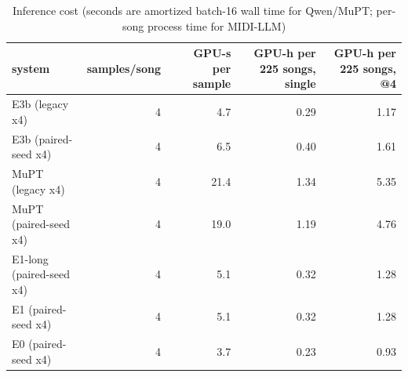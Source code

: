 \begin{table}[t]
\centering
\small
\begin{tabular}{lrrrr}
\toprule
system & samples/song & GPU-s per sample & GPU-h per 225 songs, single & GPU-h per 225 songs, @4 \\
\midrule
E3b (legacy x4) & 4 & 4.7 & 0.29 & 1.17 \\
E3b (paired-seed x4) & 4 & 6.5 & 0.40 & 1.61 \\
MuPT (legacy x4) & 4 & 21.4 & 1.34 & 5.35 \\
MuPT (paired-seed x4) & 4 & 19.0 & 1.19 & 4.76 \\
E1-long (paired-seed x4) & 4 & 5.1 & 0.32 & 1.28 \\
E1 (paired-seed x4) & 4 & 5.1 & 0.32 & 1.28 \\
E0 (paired-seed x4) & 4 & 3.7 & 0.23 & 0.93 \\
\bottomrule
\end{tabular}
\caption{Inference cost (seconds are amortized batch-16 wall time for Qwen/MuPT; per-song process time for MIDI-LLM)}
\label{tab:decoding_cost}
\end{table}
